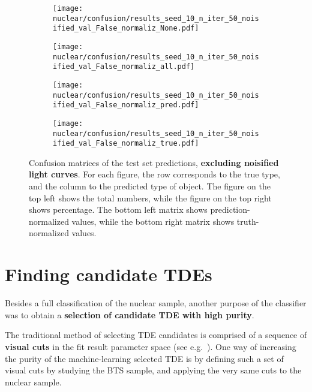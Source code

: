 \begin{figure}[htb]
    \centering
    \begin{subfigure}[b]{0.49\textwidth}
        \centering
        \texttt{[image: nuclear/confusion/results\_seed\_10\_n\_iter\_50\_noisified\_val\_False\_normaliz\_None.pdf]}
    \end{subfigure}
    \begin{subfigure}[b]{0.49\textwidth}
        \centering
        \texttt{[image: nuclear/confusion/results\_seed\_10\_n\_iter\_50\_noisified\_val\_False\_normaliz\_all.pdf]}
    \end{subfigure}
    \begin{subfigure}[b]{0.49\textwidth}
        \centering
        \texttt{[image: nuclear/confusion/results\_seed\_10\_n\_iter\_50\_noisified\_val\_False\_normaliz\_pred.pdf]}
    \end{subfigure}
    \begin{subfigure}[b]{0.49\textwidth}
        \centering
        \texttt{[image: nuclear/confusion/results\_seed\_10\_n\_iter\_50\_noisified\_val\_False\_normaliz\_true.pdf]}
    \end{subfigure}
    \caption[Confusion matrices]{Confusion matrices of the test set predictions, \textbf{excluding noisified light curves}. For each figure, the row corresponds to the true type, and the column to the predicted type of object. The figure on the top left shows the total numbers, while the figure on the top right shows percentage. The bottom left matrix shows prediction-normalized values, while the bottom right matrix shows truth-normalized values.}
\end{figure}


\section{Finding candidate TDEs}
Besides a full classification of the nuclear sample, another purpose of the classifier was to obtain a \textbf{selection of candidate TDE with high purity}.

The traditional method of selecting TDE candidates is comprised of a sequence of \textbf{visual cuts} in the fit result parameter space (see e.g.~\cite{Velzen2019}). One way of increasing the purity of the machine-learning selected TDE is by defining such a set of visual cuts by studying the BTS sample, and applying the very same cuts to the nuclear sample.

